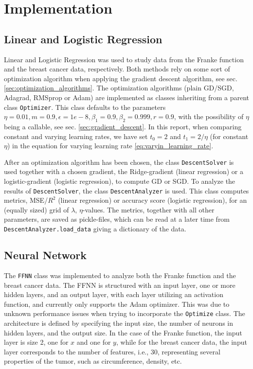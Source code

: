 \documentclass[%
reprint,s
amsmath,amssymb,
aps,
]{revtex4-2}
\begin{document}
\section{Implementation}
\subsection{Linear and Logistic Regression}
Linear and Logistic Regression was used to study data from the Franke function and the breast cancer data, respectively. Both methods rely on some sort of optimization algorithm when applying the gradient descent algorithm, see sec. \ref{sec:optimization_algorithms}. The optimization algorithms (plain GD/SGD, Adagrad, RMSprop or Adam) are implemented as classes inheriting from a parent class \texttt{Optimizer}. This class defaults to the parameters \(\eta=0.01, m=0.9, \epsilon=1e-8, \beta_1=0.9, \beta_2=0.999, r=0.9\), with the possibility of \(\eta\) being a callable, see sec. \ref{sec:gradient_descent}. In this report, when comparing constant and varying learning rates, we have set \(t_0 = 2\) and \(t_{1} = 2/\eta\) (for constant \(\eta\)) in the equation for varying learning rate \eqref{eq:varyin_learning_rate}.

After an optimization algorithm has been chosen, the class \texttt{DescentSolver} is used together with a chosen gradient, the Ridge-gradient (linear regression) or a logistic-gradient (logistic regression), to compute GD or SGD. To analyze the results of \texttt{DescentSolver}, the class \texttt{DescentAnalyzer} is used. This class computes metrics, MSE/\(R^2\) (linear regression) or accuracy score (logistic regression), for an (equally sized) grid of \(\lambda\), \(\eta\)-values. The metrics, together with all other parameters, are saved as pickle-files, which can be read at a later time from \texttt{DescentAnalyzer.load\_data} giving a dictionary of the data. 

\subsection{Neural Network}
The \texttt{FFNN} class was implemented to analyze both the Franke function and the breast cancer data. The FFNN is structured with an input layer, one or more hidden layers, and an output layer, with each layer utilizing an activation function, and currently only supports the Adam optimizer. This was due to unknown performance issues when trying to incorporate the \texttt{Optimize} class. The architecture is defined by specifying the input size, the number of neurons in hidden layers, and the output size. In the case of the Franke function, the input layer is size 2, one for \(x\) and one for \(y\), while for the breast cancer data, the input layer corresponds to the number of features, i.e., \(30\), representing several properties of the tumor, such as circumference, density, etc.
\end{document}
